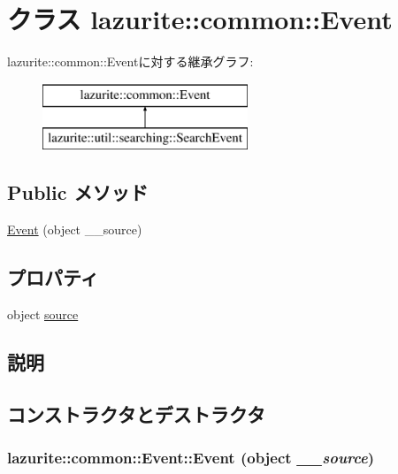 \hypertarget{classlazurite_1_1common_1_1_event}{
\section{クラス lazurite::common::Event}
\label{classlazurite_1_1common_1_1_event}
}
lazurite::common::Eventに対する継承グラフ:\begin{figure}[H]
\begin{center}
\leavevmode
\includegraphics[height=2cm]{classlazurite_1_1common_1_1_event}
\end{center}
\end{figure}
\subsection*{Public メソッド}
\begin{DoxyCompactItemize}
\item 
\hyperlink{classlazurite_1_1common_1_1_event_ab6cb2fc3a46fc0bc0346bea4a0e66739}{Event} (object \_\-\_\-source)
\end{DoxyCompactItemize}
\subsection*{プロパティ}
\begin{DoxyCompactItemize}
\item 
object \hyperlink{classlazurite_1_1common_1_1_event_a65acbd55d51fcff33a61adcfc225970a}{source}
\end{DoxyCompactItemize}


\subsection{説明}


\subsection{コンストラクタとデストラクタ}
\hypertarget{classlazurite_1_1common_1_1_event_ab6cb2fc3a46fc0bc0346bea4a0e66739}{
\subsubsection[{Event}]{\setlength{\rightskip}{0pt plus 5cm}lazurite::common::Event::Event (object {\em \_\-\_\-source})}}
\label{classlazurite_1_1common_1_1_event_ab6cb2fc3a46fc0bc0346bea4a0e66739}


